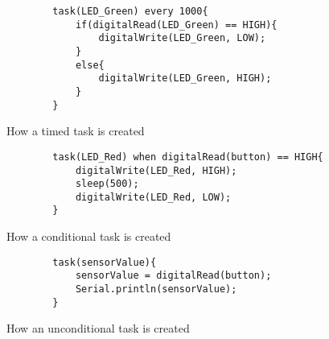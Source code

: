 \begin{listing}
    \begin{verbatim}
        task(LED_Green) every 1000{
            if(digitalRead(LED_Green) == HIGH){
                digitalWrite(LED_Green, LOW);
            }
            else{
                digitalWrite(LED_Green, HIGH);
            }
        }
    \end{verbatim}
    \caption{How a timed task is created}
    \label{List: Timed task example}
\end{listing}

\begin{listing}
    \begin{verbatim}
        task(LED_Red) when digitalRead(button) == HIGH{
            digitalWrite(LED_Red, HIGH);
            sleep(500);
            digitalWrite(LED_Red, LOW); 
        }
    \end{verbatim}
    \caption{How a conditional task is created}
    \label{List: conditional task example}
\end{listing}

\begin{listing}
    \begin{verbatim}
        task(sensorValue){
            sensorValue = digitalRead(button);
            Serial.println(sensorValue);
        }
    \end{verbatim}
    \caption{How an unconditional task is created}
    \label{List: unconditional task example}
\end{listing}





